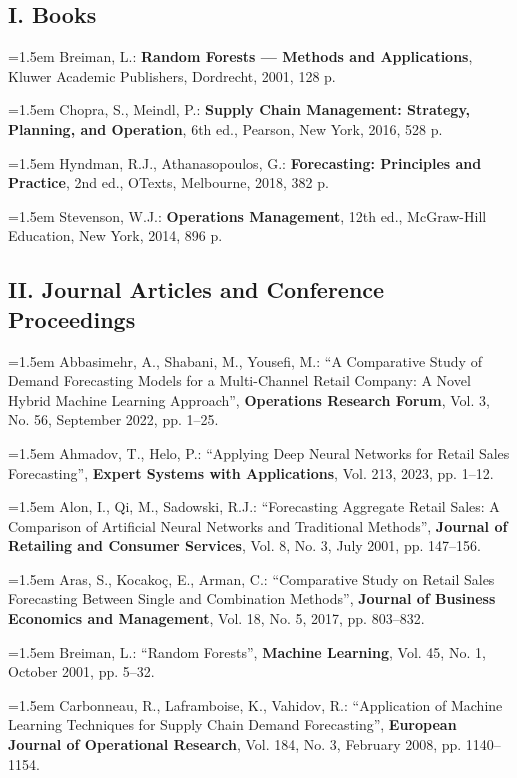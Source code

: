 \subsection*{I. Books}

\hangindent=1.5em
Breiman, L.: \textbf{Random Forests — Methods and Applications}, Kluwer
Academic Publishers, Dordrecht, 2001, 128 p.

\medskip\hangindent=1.5em
Chopra, S., Meindl, P.: \textbf{Supply Chain Management: Strategy, Planning,
and Operation}, 6th ed., Pearson, New York, 2016, 528 p.

\medskip\hangindent=1.5em
Hyndman, R.J., Athanasopoulos, G.: \textbf{Forecasting: Principles and
Practice}, 2nd ed., OTexts, Melbourne, 2018, 382 p.

\medskip\hangindent=1.5em
Stevenson, W.J.: \textbf{Operations Management}, 12th ed., McGraw-Hill
Education, New York, 2014, 896 p.

\subsection*{II. Journal Articles and Conference Proceedings}

\hangindent=1.5em
Abbasimehr, A., Shabani, M., Yousefi, M.: ``A Comparative Study of Demand
Forecasting Models for a Multi-Channel Retail Company: A Novel Hybrid Machine
Learning Approach'', \textbf{Operations Research Forum}, Vol. 3, No. 56,
September 2022, pp. 1--25.

\medskip\hangindent=1.5em
Ahmadov, T., Helo, P.: ``Applying Deep Neural Networks for Retail Sales
Forecasting'', \textbf{Expert Systems with Applications}, Vol. 213, 2023,
pp. 1--12.

\medskip\hangindent=1.5em
Alon, I., Qi, M., Sadowski, R.J.: ``Forecasting Aggregate Retail Sales: A
Comparison of Artificial Neural Networks and Traditional Methods'',
\textbf{Journal of Retailing and Consumer Services}, Vol. 8, No. 3,
July 2001, pp. 147--156.

\medskip\hangindent=1.5em
Aras, S., Kocakoç, E., Arman, C.: ``Comparative Study on Retail Sales
Forecasting Between Single and Combination Methods'', \textbf{Journal of
Business Economics and Management}, Vol. 18, No. 5, 2017, pp. 803--832.

\medskip\hangindent=1.5em
Breiman, L.: ``Random Forests'', \textbf{Machine Learning}, Vol. 45, No. 1,
October 2001, pp. 5--32.

\medskip\hangindent=1.5em
Carbonneau, R., Laframboise, K., Vahidov, R.: ``Application of Machine
Learning Techniques for Supply Chain Demand Forecasting'',
\textbf{European Journal of Operational Research}, Vol. 184, No. 3,
February 2008, pp. 1140--1154.

